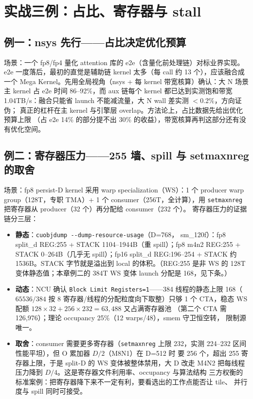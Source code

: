 \section{实战三例：占比、寄存器与 stall}\label{sec:ch00-cases}

\subsection{例一：nsys 先行——占比决定优化预算}

场景：一个 fp8/fp4 量化 attention 库的 e2e（含量化前处理链）对标业界实现。
e2e 一度落后，最初的直觉是辅助链 kernel 太多（每 call 约 13 个），应该融合成
一个 Mega Kernel。先用全局视角（nsys + 每 kernel 带宽核算）确认：大 N 场景
主 kernel 占 e2e 时间 86--92\%，而 aux 链每个 kernel 都已达到实测饱和带宽
1.04TB/s：融合只能省 launch 不能减流量，大 N wall 差实测 $<$0.2\%，方向证伪；
真正的杠杆在主 kernel 与引擎层 overlap。方法论上，占比数据先给出优化预算上限
（占 e2e 14\% 的部分提不出 30\% 的收益），带宽核算再判这部分还有没有优化空间。

\subsection{例二：寄存器压力——255 墙、spill 与 setmaxnreg 的取舍}

场景：fp8 persist-D kernel 采用 warp specialization（WS）：1 个 producer
warp group（128T，专职 TMA）+ 1 个 consumer（256T，全计算），用
\texttt{setmaxnreg} 把寄存器从 producer（32 个）再分配给 consumer（232 个）。
寄存器压力的证据链分三层：

\begin{itemize}
\item \textbf{静态}：\texttt{cuobjdump -{}-dump-resource-usage}（D=768，
  sm\_120f）：fp8 split\_d REG:255 + STACK 1104--1944B（重 spill）；fp8
  m4n2 REG:255 + STACK 0--264B（几乎无 spill）；fp16 split\_d REG:196--254
  + STACK 约 1536B。STACK 字节就是溢出到 local 的体积。（REG:255 是非 WS 的
  128T 变体静态值；本章例二的 384T WS 变体 launch 分配是 168，见下条。）
\item \textbf{动态}：NCU 确认 \texttt{Block Limit Registers=1}——384 线程的静态上限
  168（$65536/384$ 按 8 寄存器/线程的分配粒度向下取整）只够 1 个 CTA，稳态 WS 配额 $128\times32 + 256\times232 = 63{,}488$ 又占满寄存器池
  （第二个 CTA 需 126{,}976）；理论 occupancy 25\%（12 warps/48），smem 守卫恒空转，
  限制源唯一。
\item \textbf{取舍}：consumer 需要更多寄存器（\texttt{setmaxnreg} 上限
  232，实测 224--232 区间性能平坦），但 O 累加器 $D/2$（M8N1）在 D=512 时
  要 256 个，超出 255 寄存器上限，于是 split-D 的 WS 变体被整体禁用，大 D 改走
  M4N2 把每线程压力降到 $D/4$。这是寄存器文件利用率、occupancy 与算法结构
  三方权衡的标准案例：把寄存器降下来不一定有利，要看选出的工作点能否让 tile、
  并行度与 spill 同时可接受。
\end{itemize}

